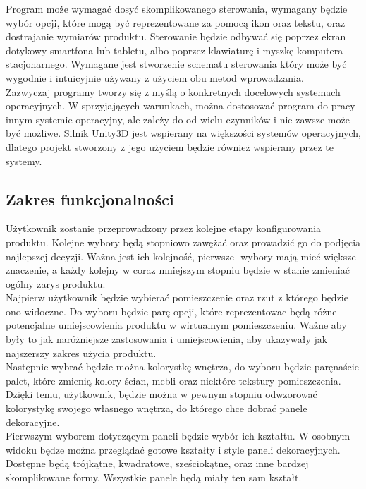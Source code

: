 \documentclass{article} %
\begin{document}
        Program może wymagać dosyć skomplikowanego sterowania, wymagany będzie wybór opcji, które mogą być reprezentowane za pomocą ikon oraz tekstu, oraz dostrajanie wymiarów produktu. Sterowanie będzie odbywać się poprzez ekran dotykowy smartfona lub tabletu, albo poprzez klawiaturę i myszkę komputera stacjonarnego. Wymagane jest stworzenie schematu sterowania który może być wygodnie i intuicyjnie używany z użyciem obu metod wprowadzania.
        \\
        
        Zazwyczaj programy tworzy się z myślą o konkretnych docelowych systemach operacyjnych. W sprzyjających warunkach, można dostosować program do pracy innym systemie operacyjny, ale zależy do od wielu czynników i nie zawsze może być możliwe. Silnik Unity3D jest wspierany na większości systemów operacyjnych, dlatego projekt stworzony z jego użyciem będzie również wspierany przez te systemy.
        \\
        
        
    \subsection{Zakres funkcjonalności}
        Użytkownik zostanie przeprowadzony przez kolejne etapy konfigurowania produktu. Kolejne wybory będą stopniowo zawężać oraz prowadzić go do podjęcia najlepszej decyzji. Ważna jest ich kolejność, pierwsze -wybory mają mieć większe znaczenie, a każdy kolejny w coraz mniejszym stopniu będzie w stanie zmieniać ogólny zarys produktu.
        \\
        
        Najpierw użytkownik będzie wybierać pomieszczenie oraz rzut z którego będzie ono widoczne. Do wyboru będzie parę opcji, które reprezentowac będą różne potencjalne umiejscowienia produktu w wirtualnym pomieszczeniu. Ważne aby były to jak naróżniejsze zastosowania i umiejscowienia, aby ukazywały jak najszerszy zakres użycia produktu. 
        \\
        
        Następnie wybrać będzie można kolorystkę wnętrza, do wyboru będzie paręnaście palet, które zmienią kolory ścian, mebli oraz niektóre tekstury pomieszczenia. Dzięki temu, użytkownik, będzie można w pewnym stopniu odwzorować kolorystykę swojego własnego wnętrza, do którego chce dobrać panele dekoracyjne.
        \\
        
        Pierwszym wyborem dotyczącym paneli będzie wybór ich kształtu. W osobnym widoku będze można przeglądać gotowe kształty i style paneli dekoracyjnych. Dostępne będą trójkątne, kwadratowe, sześciokątne, oraz inne bardzej skomplikowane formy. Wszystkie panele będą miały ten sam kształt.
        \\
        
\end{document}
